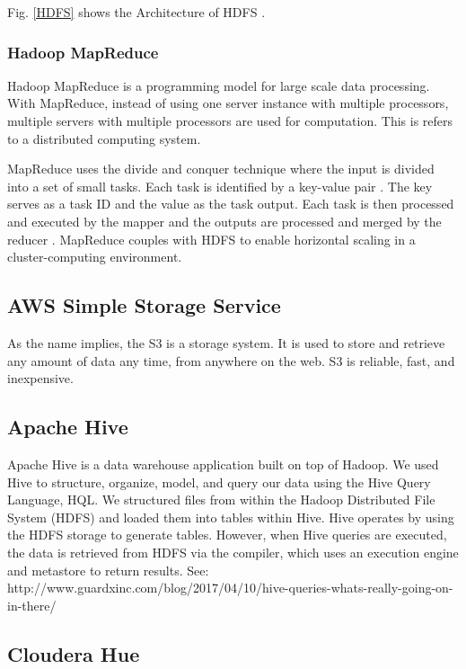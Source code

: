 \documentclass[journal]{IEEEtran}
\begin{document}
Fig. \ref{HDFS} shows the Architecture of HDFS \cite{HDFS}.

\subsubsection{Hadoop MapReduce}

Hadoop MapReduce is a programming model for large scale data processing. With MapReduce, instead of using one server instance with multiple 
processors, multiple servers with multiple processors are used for computation. This is refers to a distributed computing system.

MapReduce uses the divide and conquer technique where the input is divided into a set of small tasks. Each task is identified by a key-value 
pair \cite{Divide-and-Conquer}. The key serves as a task ID and the value as the task output. Each task is then processed and executed by the 
mapper and the outputs are processed and merged by the reducer \cite{MapReduce}. MapReduce couples with HDFS to enable horizontal
scaling in a cluster-computing environment.

\subsection{AWS Simple Storage Service}

As the name implies, the S3 is a storage system.
It is used to store and retrieve any amount of data any time, from anywhere on the web. 
S3 is reliable, fast, and inexpensive.

\subsection{Apache Hive}

Apache Hive is a data warehouse application built on top of Hadoop. We used Hive to structure, organize, model, and query our data using the Hive Query Language, HQL. We structured files from within the Hadoop Distributed File System (HDFS) and loaded them into tables within Hive. Hive operates by using the HDFS storage to generate tables. However, when Hive queries are executed, the data is retrieved from HDFS via the compiler, which uses an execution engine and metastore to return results. See: http://www.guardxinc.com/blog/2017/04/10/hive-queries-whats-really-going-on-in-there/

\subsection{Cloudera Hue}
\end{document}
